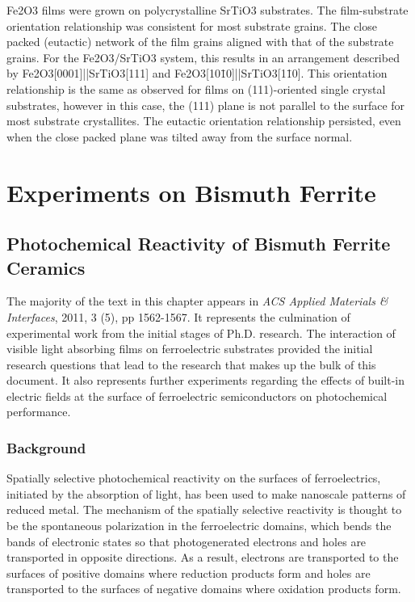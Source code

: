 \documentclass[12pt,%
              twoside,
               letterpaper]{uiothesis}
\begin{document}
Fe2O3 films were grown on polycrystalline SrTiO3 substrates. The film-substrate
orientation relationship was consistent for most substrate grains. The close packed
(eutactic) network of the film grains aligned with that of the substrate grains. For the
Fe2O3/SrTiO3 system, this results in an arrangement described by
Fe2O3[0001]||SrTiO3[111] and Fe2O3[10\={1}0]||SrTiO3[1\={1}0]. This
orientation relationship is the same as observed for films on (111)-oriented single
crystal substrates, however in this case, the (111) plane is not parallel to the surface
for most substrate crystallites. The eutactic orientation relationship persisted, even
when the close packed plane was tilted away from the surface normal.


	
	\part{Experiments on Bismuth Ferrite}	


\chapter{Photochemical Reactivity of Bismuth Ferrite Ceramics}
\label{ch:bfo}


The majority of the text in this chapter appears in \emph{ACS Applied Materials
\& Interfaces}, 2011, 3 (5), pp 1562-1567.\cite{Schultz:2011dl} It represents the
culmination of experimental work from the initial stages of Ph.D. research. The
interaction of visible light absorbing films on ferroelectric substrates provided the
initial research questions that lead to the research that makes up the bulk of this
document. It also represents further experiments regarding the effects of built-in
electric fields at the surface of ferroelectric semiconductors on photochemical
performance.


\section{Background}
\label{sec:ch7background}


Spatially selective photochemical reactivity on the surfaces of ferroelectrics, initiated
by the absorption of  light, has been used to make nanoscale patterns of reduced
metal.\cite{Giocondi:2001gz,Hanson:2006bq,Kalinin:2002iw,Tiwari:2009jv} The mechanism of
the spatially selective reactivity is thought to be the spontaneous polarization in the
ferroelectric domains, which bends the bands of electronic states so that photogenerated
electrons and holes are transported in opposite
directions.\cite{Anonymous:2011wc,FRIDKIN:1984tg} As a result, electrons are transported
to the surfaces of positive domains where reduction products form and holes are
transported to the surfaces of negative domains where oxidation products
form.\cite{Giocondi:2001gz,Burbure:2010go,Giocondi:2001bi,Burbure:2010ti,Bhardwaj:2010eh,Dunn:2007ja}
\end{document}
